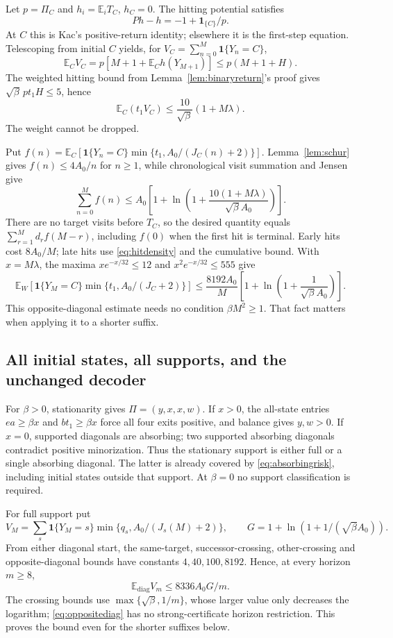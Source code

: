 \documentclass[11pt,letterpaper]{article}
\theoremstyle{definition}\newtheorem{definition}[theorem]{Definition}
\theoremstyle{remark}\newtheorem{remark}[theorem]{Remark}
\newcommand{\E}{\mathbb{E}}
\newcommand{\ind}{\mathbf{1}}
\begin{document}
Let $p=\Pi_C$ and $h_i=\E_iT_C$, $h_C=0$. The hitting potential satisfies
\[
 Ph-h=-1+\ind_{\{C\}}/p.
\]
At $C$ this is Kac's positive-return identity; elsewhere it is the first-step equation. Telescoping from initial $C$ yields, for $V_C=\sum_{n=0}^M\ind\{Y_n=C\}$,
\[
 \E_CV_C=p[M+1+\E_Ch(Y_{M+1})]\le p(M+1+H).
\]
The weighted hitting bound from Lemma~\ref{lem:binaryreturn}'s proof gives
$\sqrt\beta\,pt_1H\le5$, hence
\[
 \E_C(t_1V_C)\le\frac{10}{\sqrt\beta}(1+M\lambda).
\]
The weight cannot be dropped.

Put $f(n)=\E_C[\ind\{Y_n=C\}\min\{t_1,A_0/(J_C(n)+2)\}]$.
Lemma~\ref{lem:schur} gives $f(n)\le4A_0/n$ for $n\ge1$, while chronological visit summation and Jensen give
\[
 \sum_{n=0}^Mf(n)
 \le A_0\left[1+\ln\left(1+
 \frac{10(1+M\lambda)}{\sqrt\beta A_0}\right)\right].
\]
There are no target visits before $T_C$, so the desired quantity equals
$\sum_{r=1}^Md_rf(M-r)$, including $f(0)$ when the first hit is terminal.
Early hits cost $8A_0/M$; late hits use \eqref{eq:hitdensity} and the cumulative bound. With $x=M\lambda$, the maxima
$x e^{-x/32}\le12$ and $x^2e^{-x/32}\le555$
give
\begin{equation}\label{eq:oppositediag}
 \E_W[\ind\{Y_M=C\}\min\{t_1,A_0/(J_C+2)\}]
 \le\frac{8192A_0}{M}
 \left[1+\ln\left(1+\frac1{\sqrt\beta A_0}\right)\right].
\end{equation}
This opposite-diagonal estimate needs no condition $\beta M^2\ge1$. That fact matters when applying it to a shorter suffix.


\subsection{All initial states, all supports, and the unchanged decoder}
For $\beta>0$, stationarity gives $\Pi=(y,x,x,w)$.
If $x>0$, the all-state entries $ea\ge\beta x$ and $bt_1\ge\beta x$ force all four exits positive, and balance gives $y,w>0$. If $x=0$, supported diagonals are absorbing; two supported absorbing diagonals contradict positive minorization. Thus the stationary support is either full or a single absorbing diagonal. The latter is already covered by \eqref{eq:absorbingrisk}, including initial states outside that support. At $\beta=0$ no support classification is required.

For full support put
\[
 V_M=\sum_s\ind\{Y_M=s\}\min\{q_s,A_0/(J_s(M)+2)\},
 \qquad G=1+\ln(1+1/(\sqrt\beta A_0)).
\]
From either diagonal start, the same-target, successor-crossing, other-crossing and opposite-diagonal bounds have constants $4,40,100,8192$. Hence, at every horizon $m\ge8$,
\[
 \E_{\mathrm{diag}}V_m\le8336 A_0G/m.
\]
The crossing bounds use $\max\{\sqrt\beta,1/m\}$, whose larger value only decreases the logarithm; \eqref{eq:oppositediag} has no strong-certificate horizon restriction. This proves the bound even for the shorter suffixes below.
\end{document}
